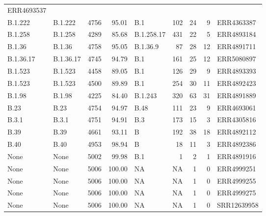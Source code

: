 \documentclass[
]{article}
\begin{document}
\begin{longtable}[]{@{}llrrlrrrl@{}}
ERR4693537\tabularnewline
B.1.222 & B.1.222 & 4756 & 95.01 & B.1 & 102 & 24 & 9 &
ERR4363387\tabularnewline
B.1.258 & B.1.258 & 4289 & 85.68 & B.1.258.17 & 431 & 22 & 5 &
ERR4893184\tabularnewline
B.1.36 & B.1.36 & 4758 & 95.05 & B.1.36.9 & 87 & 28 & 12 &
ERR4891711\tabularnewline
B.1.36.17 & B.1.36.17 & 4745 & 94.79 & B.1 & 161 & 25 & 12 &
ERR5080897\tabularnewline
B.1.523 & B.1.523 & 4458 & 89.05 & B.1 & 126 & 29 & 9 &
ERR4893393\tabularnewline
B.1.523 & B.1.523 & 4500 & 89.89 & B.1 & 254 & 30 & 11 &
ERR4892423\tabularnewline
B.1.98 & B.1.98 & 4225 & 84.40 & B.1.243 & 320 & 63 & 31 &
ERR4891889\tabularnewline
B.23 & B.23 & 4754 & 94.97 & B.48 & 111 & 23 & 9 &
ERR4693061\tabularnewline
B.3.1 & B.3.1 & 4751 & 94.91 & B.3 & 173 & 15 & 3 &
ERR4305816\tabularnewline
B.39 & B.39 & 4661 & 93.11 & B & 192 & 38 & 18 &
ERR4892112\tabularnewline
B.40 & B.40 & 4953 & 98.94 & B & 18 & 11 & 3 & ERR4892386\tabularnewline
None & None & 5002 & 99.98 & B.1 & 1 & 2 & 1 & ERR4891916\tabularnewline
None & None & 5006 & 100.00 & NA & NA & 1 & 0 &
ERR4999251\tabularnewline
None & None & 5006 & 100.00 & NA & NA & 1 & 0 &
ERR4999255\tabularnewline
None & None & 5006 & 100.00 & NA & NA & 1 & 0 &
ERR4999275\tabularnewline
None & None & 5006 & 100.00 & NA & NA & 1 & 0 &
SRR12639958\tabularnewline
\bottomrule
\end{longtable}

\normalsize

\renewcommand\refname{Bibliography}
  
\end{document}
